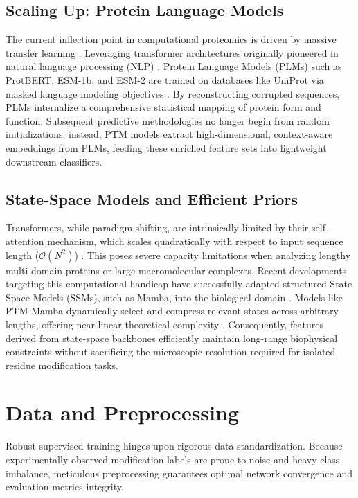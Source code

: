 \documentclass[conference]{IEEEtran}
\begin{document}
\subsection{Scaling Up: Protein Language Models}
The current inflection point in computational proteomics is driven by massive transfer learning \cite{elnaggar2020}. Leveraging transformer architectures originally pioneered in natural language processing (NLP) \cite{vaswani2017attention}, Protein Language Models (PLMs) such as ProtBERT, ESM-1b, and ESM-2 are trained on databases like UniProt via masked language modeling objectives \cite{lin2022,rives2021scaling}. By reconstructing corrupted sequences, PLMs internalize a comprehensive statistical mapping of protein form and function. Subsequent predictive methodologies no longer begin from random initializations; instead, PTM models extract high-dimensional, context-aware embeddings from PLMs, feeding these enriched feature sets into lightweight downstream classifiers. 

\subsection{State-Space Models and Efficient Priors}
Transformers, while paradigm-shifting, are intrinsically limited by their self-attention mechanism, which scales quadratically with respect to input sequence length ($\mathcal{O}(N^2)$) \cite{vaswani2017attention}. This poses severe capacity limitations when analyzing lengthy multi-domain proteins or large macromolecular complexes. Recent developments targeting this computational handicap have successfully adapted structured State Space Models (SSMs), such as Mamba, into the biological domain \cite{gu2020hippo,gu2022s4}. Models like PTM-Mamba dynamically select and compress relevant states across arbitrary lengths, offering near-linear theoretical complexity \cite{peng2024ptm}. Consequently, features derived from state-space backbones efficiently maintain long-range biophysical constraints without sacrificing the microscopic resolution required for isolated residue modification tasks.

\section{Data and Preprocessing}

Robust supervised training hinges upon rigorous data standardization. Because experimentally observed modification labels are prone to noise and heavy class imbalance, meticulous preprocessing guarantees optimal network convergence and evaluation metrics integrity.
\end{document}
